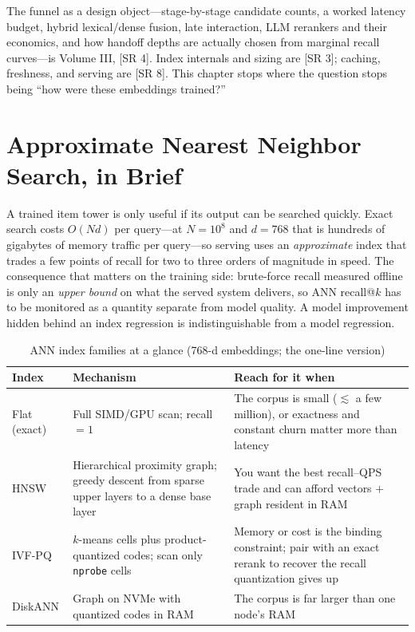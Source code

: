 \begin{keyinsight}
The funnel as a design object---stage-by-stage candidate counts, a worked latency budget, hybrid lexical/dense fusion, late interaction, LLM rerankers and their economics, and how handoff depths are actually chosen from marginal recall curves---is Volume III, [SR 4]. Index internals and sizing are [SR 3]; caching, freshness, and serving are [SR 8]. This chapter stops where the question stops being ``how were these embeddings trained?''
\end{keyinsight}

\section{Approximate Nearest Neighbor Search, in Brief}
\label{sec:ann}

A trained item tower is only useful if its output can be searched quickly. Exact search costs $O(Nd)$ per query---at $N = 10^8$ and $d = 768$ that is hundreds of gigabytes of memory traffic per query---so serving uses an \textit{approximate} index that trades a few points of recall for two to three orders of magnitude in speed. The consequence that matters on the training side: brute-force recall measured offline is only an \textit{upper bound} on what the served system delivers, so ANN recall@$k$ has to be monitored as a quantity separate from model quality. A model improvement hidden behind an index regression is indistinguishable from a model regression.

\begin{table}[H]
\centering
\caption{ANN index families at a glance (768-d embeddings; the one-line version)}
\label{fig:hnsw}%
\begin{tabularx}{\textwidth}{lXX}
\toprule
\textbf{Index} & \textbf{Mechanism} & \textbf{Reach for it when} \\
\midrule
Flat (exact) & Full SIMD/GPU scan; recall $=1$ & The corpus is small ($\lesssim$ a few million), or exactness and constant churn matter more than latency \\
HNSW & Hierarchical proximity graph; greedy descent from sparse upper layers to a dense base layer & You want the best recall--QPS trade and can afford vectors $+$ graph resident in RAM \\
IVF-PQ & $k$-means cells plus product-quantized codes; scan only \texttt{nprobe} cells & Memory or cost is the binding constraint; pair with an exact rerank to recover the recall quantization gives up \\
DiskANN & Graph on NVMe with quantized codes in RAM & The corpus is far larger than one node's RAM \\
\bottomrule
\end{tabularx}
\end{table}

